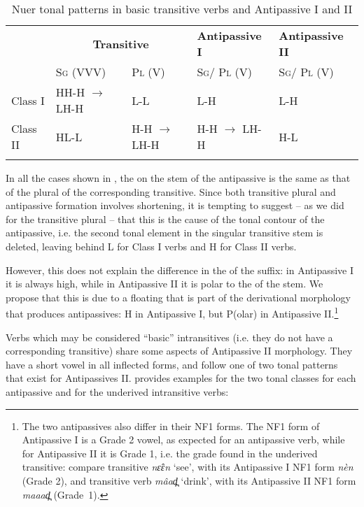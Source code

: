 \documentclass[output=paper,newtxmath,modfonts,nonflat,draftmode]{langsci/langscibook}
\begin{document}
\begin{table}
\begin{tabularx}{\textwidth}{llXXX} 
\lsptoprule
& \multicolumn{2}{c}{\bfseries Transitive} & \bfseries Antipassive I & \bfseries Antipassive II\\
& \textsc{Sg} (VVV) & \textsc{Pl} (V) & \textsc{Sg}/ \textsc{Pl} (V) & \textsc{Sg}/ \textsc{Pl} (V)\\
\midrule
Class I & HH-H $\rightarrow$ LH-H & L-L & L-H & L-H\\
Class II & HL-L & H-H $\rightarrow$ LH-H & H-H $\rightarrow$ LH-H & H-L\\
\lspbottomrule
\end{tabularx}
\caption{Nuer tonal patterns in basic transitive verbs and Antipassive I and II}
\label{tab:monich:13}
\end{table}

In all the cases shown in , the  on the stem of the antipassive is the same as that of the plural of the corresponding  transitive. Since both transitive plural and antipassive formation involves shortening, it is tempting to suggest – as we did for the transitive plural – that this is the cause of the tonal contour of the antipassive, i.e. the second tonal element in the singular transitive stem is deleted, leaving behind L for Class I verbs and H for Class II verbs. 

However, this does not explain the difference in the  of the suffix: in Antipassive I it is always high, while in Antipassive II it is polar to the  of the stem. We propose that this is due to a floating  that is part of the derivational morphology that produces antipassives: H in Antipassive I, but P(olar) in Antipassive II.\footnote{The\label{fn:monich:10} two antipassives also differ in their NF1 forms. The NF1 form of Antipassive I is a Grade 2 vowel, as expected for an antipassive verb, while for Antipassive II it is Grade 1, i.e. the grade found in the underived transitive: compare transitive \textit{nɛ̂ɛn} ‘see’, with its Antipassive I NF1 form \textit{nèn} (Grade 2), and transitive verb \textit{mâad̪} ‘drink’, with its Antipassive II NF1 form \textit{maaad̪} (Grade~1).}  

Verbs which may be considered “basic” intransitives (i.e. they do not have a corresponding transitive) share some aspects of Antipassive II morphology. They have a short vowel in all inflected forms, and follow one of two tonal patterns that exist for Antipassives II.  provides examples for the two tonal classes for each antipassive and for the underived intransitive verbs:
\end{document}
